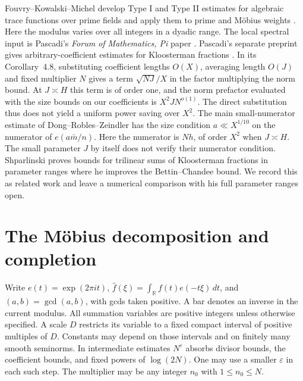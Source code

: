 \documentclass[11pt]{amsart}
\numberwithin{equation}{section}
\theoremstyle{remark}
\begin{document}
Fouvry--Kowalski--Michel develop Type I and Type II estimates for
algebraic trace functions over prime fields and apply them to
prime and M\"obius weights \cite{FKM}. Here the modulus varies over
all integers in a dyadic range. The local spectral input is
Pascadi's \emph{Forum of Mathematics, Pi} paper
\cite[Corollary~5.5 and (5.20)]{PascadiPi}. Pascadi's separate
preprint gives arbitrary-coefficient estimates for Kloosterman
fractions \cite{PascadiFractions}. In its Corollary~4.8, substituting
coefficient lengths \(O(X)\), averaging length \(O(J)\) and fixed
multiplier \(N\) gives a term \(\sqrt{NJ}/X\) in the factor
multiplying the norm bound. At \(J\asymp H\) this term is of order
one, and the norm prefactor evaluated with the size bounds on our
coefficients is \(X^2J N^{o(1)}\). The direct substitution thus
does not yield a uniform power saving over \(X^2\).
The main small-numerator estimate of Dong--Robles--Zeindler
\cite[Theorem~1.1]{DRZ} has the size condition \(a\ll X^{1/10}\) on the numerator
of \(e(a\bar m/n)\). Here the numerator is \(Nh\), of order \(X^2\)
when \(J\asymp H\). The small parameter \(J\) by itself does not
verify their numerator condition. Shparlinski \cite{Shp} proves
bounds for trilinear sums of Kloosterman fractions in
parameter ranges where he improves the Bettin--Chandee bound. We record this
as related work and leave a numerical comparison with his full
parameter ranges open.

\section{The M\"obius decomposition and completion}
\label{sec:completion}

Write \(e(t)=\exp(2\pi i t)\), \(\widehat f(\xi)=\int_{\mathbb R}f(t)e(-t\xi)\,dt\), and \((a,b)=\gcd(a,b)\), with gcds taken positive. A bar denotes an inverse in the current modulus. All summation variables are positive integers unless otherwise specified. A scale \(D\) restricts its variable to a fixed compact interval of positive multiples of \(D\). Constants may depend on those intervals and on finitely many smooth seminorms. In intermediate estimates \(N^\varepsilon\) absorbs divisor bounds, the coefficient bounds, and fixed powers of \(\log(2N)\). One may use a smaller \(\varepsilon\) in each such step. The multiplier may be any integer \(n_0\) with \(1\le n_0\le N\).
\end{document}
